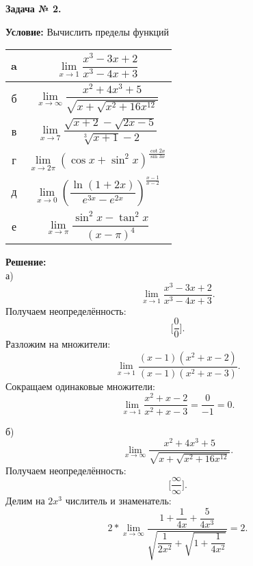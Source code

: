 \documentclass[12pt]{article}
\begin{document}
\begin{center}
\textbf{Задача № 2.}
\end{center}
\textbf{Условие:}
Вычислить пределы функций
\begin{table}[h]
\centering
\begin{tabular}{|c|c|}
\hline
a & $\lim\limits_{x\rightarrow 1} \dfrac{x^3-3x+2}{x^3-4x+3}$ \\
\hline
б & $\lim\limits_{x\rightarrow \infty} \dfrac{x^2+4x^3+5}{\sqrt{x+\sqrt{x^2+16x^{12}}}}$ \\
\hline
в & $\lim\limits_{x\rightarrow 7} \dfrac{\sqrt{x+2}-\sqrt{2x-5}}{\sqrt[3]{x+1}-2}$\\
\hline
г & $\lim\limits_{x\rightarrow {2\pi}}(\cos{x}+\sin^2{x})^{\frac{\cot{2x}}{\sin{3x}}}$\\
\hline
д & $\lim\limits_{x\rightarrow 0} (\dfrac{\ln{(1+2x)}}{e^{3x}-e^{2x}})^{\frac{x-1}{x-2}}$ \\
\hline
е & $\lim\limits_{x\rightarrow \pi} \dfrac{\sin^2{x}-\tan^2{x}}{(x-\pi)^4}$\\
\hline
\end{tabular}
\end{table}

\textbf{Решение:}\\
а)
$$\lim\limits_{x\rightarrow 1} \dfrac{x^3-3x+2}{x^3-4x+3}.$$
Получаем неопределённость: $$\biggl[\dfrac{0}{0}\biggr].$$
Разложим на множители:
$$\lim\limits_{x\rightarrow 1} \dfrac{(x-1)(x^2+x-2)}{(x-1)(x^2+x-3)} .$$
Сокращаем одинаковые множители:
$$\lim\limits_{x\rightarrow 1} \dfrac{x^2+x-2}{x^2+x-3}=\dfrac{0}{-1}=0.$$

б)
$$\lim\limits_{x\rightarrow\infty} \dfrac{x^2+4x^3+5}{\sqrt{x+\sqrt{x^2+16x^{12}}}}.$$
Получаем неопределённость: $$\biggl[\dfrac{\infty}{\infty}\biggr].$$
Делим на $2x^3$ числитель и знаменатель:
$$2*\lim\limits_{x\rightarrow\infty} \dfrac{1+\dfrac{1}{4x}+\dfrac{5}{4x^3}}{\sqrt{\dfrac{1}{2x^2}+\sqrt{1+\dfrac{1}{4x^2}}}} = 2.$$
\end{document}
